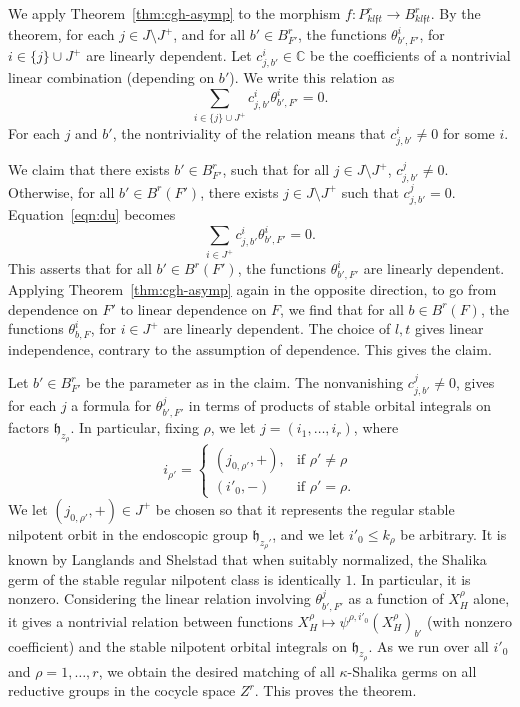 \documentclass[12pt]{amsart}
\newcommand{\ring}[1]{{\mathbb #1}}
\def\s{{\mathfrak{f}}}
\newcommand{\fh}{\mathfrak{h}}
\theoremstyle{plain}
\theoremstyle{definition}
\begin{document}
We apply Theorem~\ref{thm:cgh-asymp} to the morphism $f:P^r_{kl\s t}\to
B^r_{kl\s t}$.  By the theorem, for each $j\in J\setminus J^+$, and for
all $b'\in B^r_{F'}$, the functions $\theta^i_{b',F'}$, for $i\in
\{j\}\cup J^+$ are linearly dependent.  Let $c^i_{j,b'}\in \ring{C}$
be the coefficients of a nontrivial linear combination (depending on
$b'$).  We write this relation as
\begin{equation}\label{eqn:du}
\sum_{i\in \{j\}\cup J^+} c^i_{j,b'}\theta^i_{b',F'}  = 0.
\end{equation}
For each $j$ and $b'$, the nontriviality of the relation
means
that $c^i_{j,b'}\ne 0$ for some $i$.

We claim that there exists $b'\in B^r_{F'}$, such that for all $j\in
J\setminus J^+$,
$c^j_{j,b'}\ne 0$.  Otherwise, for all $b'\in B^r(F')$, there exists
$j\in J\setminus J^+$ such that $c^j_{j,b'}=0$.  Equation~\ref{eqn:du}
becomes
\begin{equation}\label{eqn:du}
\sum_{i\in J^+} c^i_{j,b'}\theta^i_{b',F'}  = 0.
\end{equation}
This asserts that for all $b'\in B^r(F')$, the functions
$\theta^i_{b',F'}$ are linearly dependent.  Applying
Theorem~\ref{thm:cgh-asymp} again in the opposite direction, to go from
dependence on $F'$ to linear dependence on $F$, we find that for all
$b\in B^r(F)$, the functions $\theta^i_{b,F}$, for $i\in J^+$ are linearly
dependent.  The choice of $l,t$ gives linear independence, contrary to
the assumption of dependence.  This gives the claim.

Let $b'\in B^r_{F'}$ be the parameter as in the claim.  The
nonvanishing $c^j_{j,b'}\ne 0$, gives for each $j$ a formula for
$\theta^j_{b',F'}$ in terms of products of stable orbital integrals on
factors $\fh_{z_\rho}$.  In particular, fixing $\rho$, we let
$j = (i_1,\ldots,i_r)$, where 
\[
i_{\rho'} = \begin{cases} (j_{0,\rho'},+), &\text{if } \rho'\ne \rho\\
       (i'_0,-) & \text{if } \rho' = \rho.
  \end{cases}
\]
We let $(j_{0,\rho'},+)\in J^+$ be chosen so that it represents the
regular stable nilpotent orbit in the endoscopic group
$\fh_{z_\rho'}$, and we let $i'_0\le k_{\rho}$ be arbitrary.  It is
known by Langlands and Shelstad that when suitably normalized, the
Shalika germ of the stable regular nilpotent class is identically $1$.
In particular, it is nonzero.  Considering the linear relation
involving $\theta^j_{b',F'}$ as a function of $X_H^\rho$ alone, it
gives a nontrivial relation between functions
$X_H^\rho\mapsto\psi^{\rho,i'_0}(X_H^\rho)_{b'}$ (with nonzero
coefficient) and the stable nilpotent orbital integrals on
$\fh_{z_\rho}$. As we run over all $i'_0$ and $\rho=1,\ldots,r$, we
obtain the desired matching of all $\kappa$-Shalika germs on all
reductive groups in the cocycle space $Z^r$.  This proves the theorem.
\end{document}
